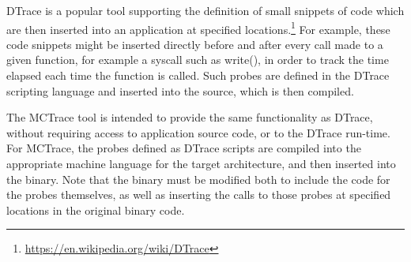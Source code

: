 DTrace is a popular tool supporting the definition of small snippets of code which are then inserted into an application at specified locations.\footnote{\url{https://en.wikipedia.org/wiki/DTrace}}  For example, these code snippets might be inserted directly before and after every call made to a given function, for example a syscall such as write(), in order to track the time elapsed each time the function is called.  Such probes are defined in the DTrace scripting language and inserted into the source, which is then compiled.

The MCTrace tool is intended to provide the same functionality as DTrace, without requiring access to application source code, or to the DTrace run-time.  For MCTrace, the probes defined as DTrace scripts are  compiled into the appropriate machine language for the target architecture, and then inserted into the binary.  Note that the binary must be modified both to include the code for the probes themselves, as well as inserting the calls to those probes at specified locations in the original binary code.


  
